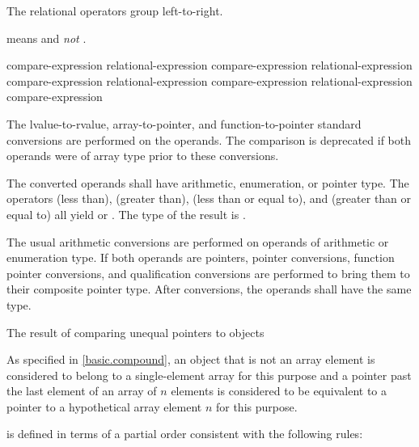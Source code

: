 \pnum
The relational operators group left-to-right.
\begin{example}
 means  and \emph{not}
.
\end{example}
%
%
%
%
%
%
%
%
%
\begin{bnf}
\br
    compare-expression\br
    relational-expression \terminal{<} compare-expression\br
    relational-expression \terminal{>} compare-expression\br
    relational-expression \terminal{<=} compare-expression\br
    relational-expression \terminal{>=} compare-expression
\end{bnf}
%
The
lvalue-to-rvalue,
array-to-pointer,
and function-to-pointer
standard conversions are performed on the operands.
The comparison is deprecated if
both operands were of array type
prior to these conversions.

\pnum
The converted operands shall have arithmetic, enumeration, or pointer type.
The
operators \tcode{<} (less than), \tcode{>} (greater than), \tcode{<=}
(less than or equal to), and \tcode{>=} (greater than or equal to) all
yield  or . The type of the result is
.

\pnum
The usual arithmetic conversions are performed on operands of arithmetic
or enumeration type. If both operands are pointers,
pointer conversions,
function pointer conversions, and
qualification conversions
are performed to bring
them to their composite pointer type.
After conversions, the operands shall have the same type.

\pnum
The result of comparing unequal pointers to objects
\begin{footnote}
As specified in \ref{basic.compound},
an object that is not an array element
is considered to belong to a
single-element array for this purpose and
a pointer past the last element of an array of $n$ elements
is considered to be equivalent to a pointer to a hypothetical array element
$n$ for this purpose.
\end{footnote}
is defined in terms of a partial order consistent with the following rules:

